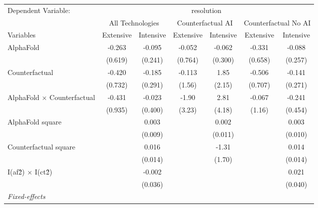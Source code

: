 \begingroup
\centering
\begin{tabular}{lcccccc}
   \tabularnewline \midrule \midrule
   Dependent Variable: & \multicolumn{6}{c}{resolution}\\
 & \multicolumn{2}{c}{All Technologies} & \multicolumn{2}{c}{Counterfactual AI} & \multicolumn{2}{c}{Counterfactual No AI} \\
\cmidrule(lr){1-1}\cmidrule(lr){2-3} \cmidrule(lr){4-5} \cmidrule(lr){6-7}
Variables & \multicolumn{1}{c}{Extensive} & \multicolumn{1}{c}{Intensive} & \multicolumn{1}{c}{Extensive} & \multicolumn{1}{c}{Intensive} & \multicolumn{1}{c}{Extensive} & \multicolumn{1}{c}{Intensive} \\
\cmidrule(lr){1-1}\cmidrule(lr){2-2} \cmidrule(lr){3-3} \cmidrule(lr){4-4} \cmidrule(lr){5-5} \cmidrule(lr){6-6} \cmidrule(lr){7-7}
   AlphaFold                          & -0.263  & -0.095  & -0.052  & -0.062  & -0.331  & -0.088\\   
                                      & (0.619) & (0.241) & (0.764) & (0.300) & (0.658) & (0.257)\\   
   Counterfactual                     & -0.420  & -0.185  & -0.113  & 1.85    & -0.506  & -0.141\\   
                                      & (0.732) & (0.291) & (1.56)  & (2.15)  & (0.707) & (0.271)\\   
   AlphaFold $\times$ Counterfactual  & -0.431  & -0.023  & -1.90   & 2.81    & -0.067  & -0.241\\   
                                      & (0.935) & (0.400) & (3.23)  & (4.18)  & (1.16)  & (0.454)\\   
   AlphaFold square                   &         & 0.003   &         & 0.002   &         & 0.003\\   
                                      &         & (0.009) &         & (0.011) &         & (0.010)\\   
   Counterfactual square              &         & 0.016   &         & -1.31   &         & 0.014\\   
                                      &         & (0.014) &         & (1.70)  &         & (0.014)\\   
   I(af\^2) $\times$ I(ct\^2)         &         & -0.002  &         &         &         & 0.021\\   
                                      &         & (0.036) &         &         &         & (0.040)\\   
   \midrule
   \emph{Fixed-effects}\\

\end{tabular}
